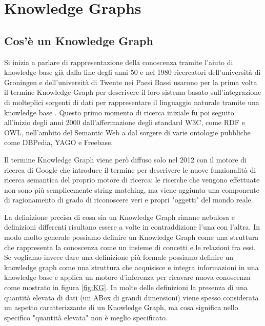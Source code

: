 \chapter{Knowledge Graphs}
\label{cha:vkg}

\section{Cos'è un Knowledge Graph}
\label{sec:kg_description}

Si inizia a parlare di rappresentazione della conoscenza tramite l'aiuto di knowledge base già dalla fine degli anni 50 e nel 1980 ricercatori dell'università di Groningen 
e dell'università di Twente nei Paesi Bassi usarono per la prima volta il termine Knowledge Graph per descrivere il loro sistema basato sull'integrazione di molteplici sorgenti
di dati per rappresentare il linguaggio naturale tramite una knowledge base .
Questo primo momento di ricerca iniziale fu poi seguito all'inizio degli anni 2000 dall'affermazione degli standard W3C, come RDF e OWL, nell'ambito del 
Semantic Web a dal sorgere di varie ontologie pubbliche come DBPedia, YAGO e Freebase. \cite{KGDefinition} \cite{KGSurvey}

Il termine Knowledge Graph viene però diffuso solo nel 2012 con il motore di ricerca di Google che introduce il termine per descrivere
le nuove funzionalità di ricerca semantica del proprio motore di ricerca: le ricerche che vengono effettuate non sono più semplicemente string matching,
ma viene aggiunta una componente di ragionamento di grado di riconoscere veri e propri "oggetti" del mondo reale. \cite{KGDefinition}

La definizione precisa di cosa sia un Knowledge Graph rimane nebulosa e definizioni differenti risultano essere a volte in contraddizione l'una con l'altra. 
In modo molto generale possiamo definire un Knowledge Graph come una struttura che rappresenta la conoscenza come un insieme di concetti e le relazioni fra essi.
Se vogliamo invece dare una definizione più formale possiamo definire un knowledge graph come una struttura che acquisisce e integra informazioni in una knowledge base
e applica un motore d'inferenza per ricavare nuova conoscenza come mostrato in figura \ref{fig:KG}.
In molte delle definizioni la presenza di una quantità elevata di dati (un ABox di grandi dimensioni) viene spesso considerata un aspetto caratterizzante di un Knowledge Graph,
ma cosa significa nello specifico "quantità elevata" non è meglio specificato.


